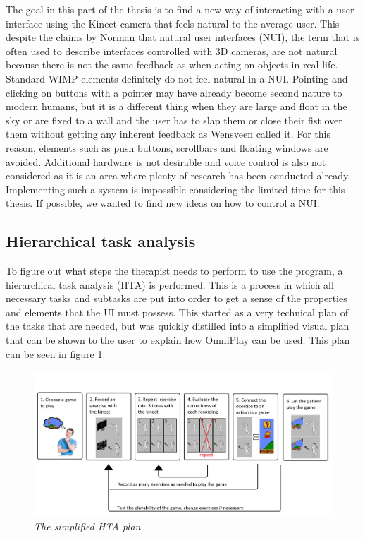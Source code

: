 The goal in this part of the thesis is to find a new way of interacting with a user interface using the Kinect camera that feels natural to the average user. This despite the claims by Norman \cite{Norman2010} that natural user interfaces (NUI), the term that is often used to describe interfaces controlled with 3D cameras, are not natural because there is not the same feedback as when acting on objects in real life. Standard WIMP elements definitely do not feel natural in a NUI. Pointing and clicking on buttons with a pointer may have already become second nature to modern humans, but it is a different thing when they are large and float in the sky or are fixed to a wall and the user has to slap them or close their fist over them without getting any inherent feedback as Wensveen \cite{Wensveen2004} called it. For this reason, elements such as push buttons, scrollbars and floating windows are avoided. Additional hardware is not desirable and voice control is also not considered as it is an area where plenty of research has been conducted already. Implementing such a system is impossible considering the limited time for this thesis. If possible, we wanted to find new ideas on how to control a NUI.


\subsection{Hierarchical task analysis}

To figure out what steps the therapist needs to perform to use the program, a hierarchical task analysis (HTA) is performed. This is a process in which all necessary tasks and subtasks are put into order to get a sense of the properties and elements that the UI must possess. This started as a very technical plan of the tasks that are needed, but was quickly distilled into a simplified visual plan that can be shown to the user to explain how OmniPlay can be used. This plan can be seen in figure \ref{HTA}.

\begin{figure}[H]
	\begin{center}
		\includegraphics[width=12cm]{figures/HTA_plan.png}
		\caption{\emph{The simplified HTA plan}}
		\label{HTA}
	\end{center}
\end{figure}


